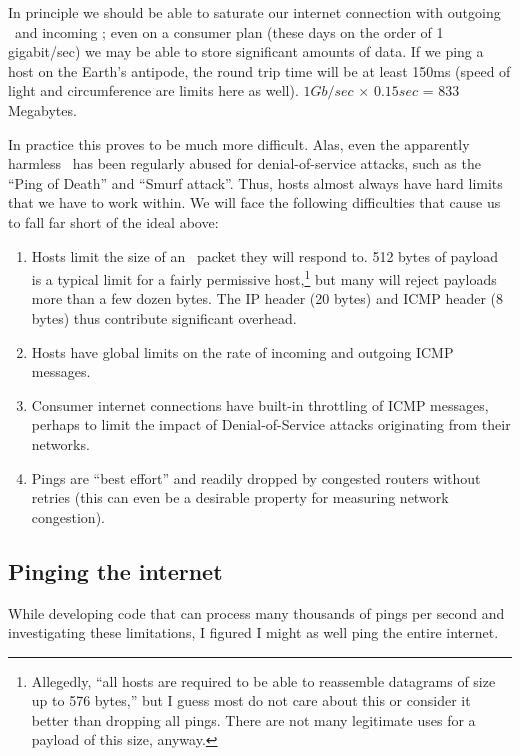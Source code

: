 \documentclass[twocolumn]{article}
\begin{document}
In principle we should be able to saturate our internet connection
with outgoing \icmpecho\ and incoming \icmpechoreply; even on a
consumer plan (these days on the order of 1 gigabit/sec) we may be
able to store significant amounts of data. If we ping a host on the
Earth's antipode, the round trip time will be at least 150ms (speed of
light and circumference are limits here as well). $1 Gb/sec$ $\times$
$0.15 sec$ = 833 Megabytes.

In practice this proves to be much more difficult. Alas, even the
apparently harmless \icmpecho\ has been regularly abused for
denial-of-service attacks, such as the ``Ping of
Death''\cite{wikipediapingofdeath} and ``Smurf
attack''\cite{wikipediasmurfattack}. Thus, hosts almost always have
hard limits that we have to work within. We will face the following
difficulties that cause us to fall far short of the ideal above:

\begin{enumerate}
\item Hosts limit the size of an \icmpecho\ packet they will respond to.
  512 bytes of payload is a typical limit for a fairly permissive
  host,\!\footnote{
    Allegedly, ``all hosts are required to be able to reassemble datagrams of
    size up to 576 bytes,''\cite{XXX} but I guess most do not care about this
    or consider it better than dropping all pings. There are not many
    legitimate uses for a payload of this size, anyway.
  }
  but many will reject payloads more than a few dozen bytes. The IP
  header (20 bytes) and ICMP header (8 bytes) thus contribute significant
  overhead.

\item Hosts have global limits on the rate of incoming and outgoing ICMP
  messages.
\item Consumer internet connections have built-in throttling of ICMP
  messages, perhaps to limit the impact of Denial-of-Service attacks
  originating from their networks.
\item Pings are ``best effort'' and readily dropped by congested
  routers without retries (this can even be a desirable property for
  measuring network congestion).
\end{enumerate}

\subsection{Pinging the internet} \label{sec:ping-internet}

While developing code that can process many thousands of pings per second
and investigating these limitations, I figured I might as well ping the
entire internet.
\end{document}
